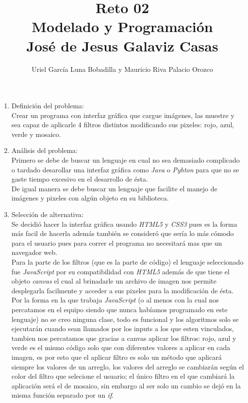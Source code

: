\documentclass[12pt]{article}
\title{Reto 02\\Modelado y Programaci\'on\\José de Jesus Galaviz Casas}
\author{Uriel Garc\'ia Luna Bobadilla y Mauricio Riva Palacio Orozco}
\date{}
\begin{document}
    \maketitle
    \begin{enumerate}
        \item Definici\'on del problema:\\  Crear un programa con interfaz gr\'afica que cargue im\'agenes, las muestre y sea capaz de aplicarle 4 filtros distintos modificando sus pixeles: rojo, azul, verde y mosaico.
        \item An\'alisis del problema:\\Primero se debe  de buscar un lenguaje en cual no sea demasiado complicado o tardado desarollar una interfaz gráfica como \textsl{Java} o \textsl{Pyhton} para que no se gaste tiempo excesivo en el desarrollo de \'esta.\\De igual manera se debe buscar un lenguaje que facilite el manejo de imágenes y pixeles con algún objeto en su biblioteca.
        \item Selecci\'on de alternativa:\\Se decidi\'o hacer la interfaz gr\'afica usando \textsl{HTML5} y \textsl{CSS3} pues es la forma m\'as facil de hacerla adem\'as tambi\'en se consider\'o que ser\'ia lo m\'as c\'omodo para el usuario pues para correr el programa no necesitar\'a mas que un navegador web.\\ Para la parte de los filtros (que es la parte de c\'odigo) el lenguaje seleccionado fue \textsl{JavaScript} por su compatibilidad con \textsl{HTML5} adem\'as de que tiene el objeto \textit{canvas} el cual al brinadarle un archivo de imagen nos permite desplegarla facilmente y acceder a sus pixeles para la modificaci\'on de \'esta.\\ Por la forma en la que trabaja \textsl{JavaScript} (o al menos con la cual nos percatamos en el equipo siendo que nunca hab\'iamos programado en este lenguaje) no se creo ninguna clase, todo es funcional y los algoritmos solo se ejecutar\'an cuando sean llamados por los inputs a los que esten vinculados, tambien nos percatamos que gracias a canvas aplicar los filtros: rojo, azul y verde es el mismo c\'odigo solo que con diferentes valores a aplicar en cada imagen, es por esto que el aplicar filtro es solo un m\'etodo que aplicar\'a siempre los valores de un arreglo, los valores del arreglo se cambiar\'an seg\'un el color del filtro que selecione el usuario; el \'unico filtro en el que cambiar\'a la aplicaci\'on ser\'a el de mosaico, sin embargo al ser solo un cambio se dej\'o en la misma funci\'on separado por un \textit{if}.

\end{enumerate}
\end{document}
